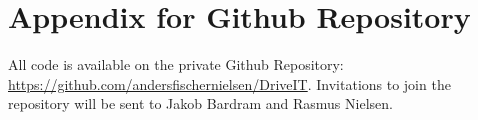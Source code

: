 \section{Appendix for Github Repository}
All code is available on the private Github Repository: \url{https://github.com/andersfischernielsen/DriveIT}. Invitations to join the repository will be sent to Jakob Bardram and Rasmus Nielsen.
